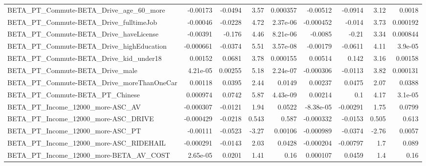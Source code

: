 \begin{tabular}{lrrrrrrrr}
BETA\_PT\_Commute-BETA\_Drive\_age\_60\_more             &    -0.00173 &      -0.0494 &     3.57 & 0.000357 &   -0.00512 &     -0.0914 &         3.12 &        0.0018 \\
BETA\_PT\_Commute-BETA\_Drive\_fulltimeJob             &    -0.00046 &      -0.0228 &     4.72 & 2.37e-06 &  -0.000452 &      -0.014 &         3.73 &      0.000192 \\
BETA\_PT\_Commute-BETA\_Drive\_haveLicense             &    -0.00391 &       -0.176 &     4.46 & 8.21e-06 &    -0.0085 &       -0.21 &         3.34 &      0.000844 \\
BETA\_PT\_Commute-BETA\_Drive\_highEducation           &   -0.000661 &      -0.0374 &     5.51 & 3.57e-08 &   -0.00179 &     -0.0611 &         4.11 &       3.9e-05 \\
BETA\_PT\_Commute-BETA\_Drive\_kid\_under18             &     0.00152 &       0.0681 &     3.78 & 0.000155 &    0.00514 &       0.142 &         3.16 &       0.00158 \\
BETA\_PT\_Commute-BETA\_Drive\_male                    &    4.21e-05 &      0.00255 &     5.18 & 2.24e-07 &  -0.000306 &     -0.0113 &         3.82 &      0.000131 \\
BETA\_PT\_Commute-BETA\_Drive\_moreThanOneCar          &     0.00118 &       0.0395 &     2.44 &   0.0149 &    0.00237 &      0.0475 &         2.07 &        0.0388 \\
BETA\_PT\_Commute-BETA\_PT\_Chinese                    &    0.000974 &       0.0742 &     5.87 & 4.43e-09 &    0.00214 &         0.1 &         4.17 &       3.1e-05 \\
BETA\_PT\_Income\_12000\_more-ASC\_AV                   &   -0.000307 &      -0.0121 &     1.94 &   0.0522 &  -8.38e-05 &    -0.00291 &         1.75 &        0.0799 \\
BETA\_PT\_Income\_12000\_more-ASC\_DRIVE                &   -0.000429 &      -0.0218 &    0.543 &    0.587 &  -0.000332 &     -0.0153 &        0.505 &         0.613 \\
BETA\_PT\_Income\_12000\_more-ASC\_PT                   &    -0.00111 &      -0.0523 &    -3.27 &  0.00106 &  -0.000989 &     -0.0374 &        -2.76 &        0.0057 \\
BETA\_PT\_Income\_12000\_more-ASC\_RIDEHAIL             &   -0.000291 &      -0.0143 &     2.03 &   0.0428 &  -0.000204 &    -0.00797 &          1.7 &         0.089 \\
BETA\_PT\_Income\_12000\_more-BETA\_AV\_COST             &    2.65e-05 &       0.0201 &     1.41 &     0.16 &   0.000107 &      0.0459 &          1.4 &          0.16 \\

\end{tabular}
